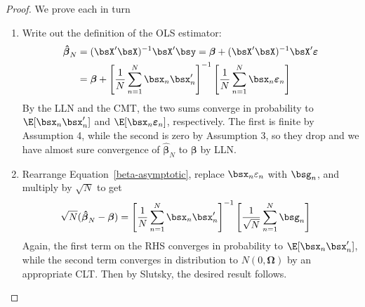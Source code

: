 \documentclass[12pt]{article}
\theoremstyle{plain}
\theoremstyle{definition}
\theoremstyle{remark}
\newcommand{\bsvarepsilon}{\boldsymbol{\varepsilon}}
\newcommand{\bsbeta}{\boldsymbol{\beta}}
\newcommand{\bsOmega}{\boldsymbol{\Omega}}
\newcommand{\bshatbeta}{\boldsymbol{\hat{\beta}}}
\newcommand{\sumnN}{\sum^N_{n=1}}
\begin{document}
\clearpage
\begin{proof}
We prove each in turn
\begin{enumerate}
  \item
    Write out the definition of the OLS estimator:
    \begin{align}
      \bshatbeta_N
      &= (\bsX'\bsX)^{-1}\bsX'\bsy
      = \bsbeta + (\bsX'\bsX)^{-1}\bsX'\bsvarepsilon \\
      &= \bsbeta + \left[\frac{1}{N}\sumnN \bsx_n\bsx_n' \right]^{-1}
        \left[\frac{1}{N} \sumnN \bsx_n\bsvarepsilon_n \right]
      \label{beta-asymptotic}
    \end{align}
    By the LLN and the CMT, the two sums converge in probability to
    $\E[\bsx_n\bsx_n']$ and $\E[\bsx_n\bsvarepsilon_n]$, respectively.
    The first is finite by Assumption 4, while the second is zero by
    Assumption 3, so they drop and we have almost sure convergence of
    $\bshatbeta_N$ to $\bsbeta$ by LLN.

  \item
    Rearrange Equation~\ref{beta-asymptotic}, replace
    $\bsx_n\varepsilon_n$ with $\bsg_n$, and multiply by $\sqrt{N}$ to
    get
    \begin{align}
      \sqrt{N}(\bshatbeta_N - \bsbeta)
      &= \left[\frac{1}{N}\sumnN \bsx_n\bsx_n' \right]^{-1}
        \left[\frac{1}{\sqrt{N}} \sumnN \bsg_n \right]
    \end{align}
    Again, the first term on the RHS converges in probability to
    $\E[\bsx_n\bsx_n']$, while the second term
    converges in distribution to $N(0,\bsOmega)$ by an appropriate CLT.
    Then by Slutsky, the desired result follows.


\end{enumerate}
\end{proof}
\end{document}
